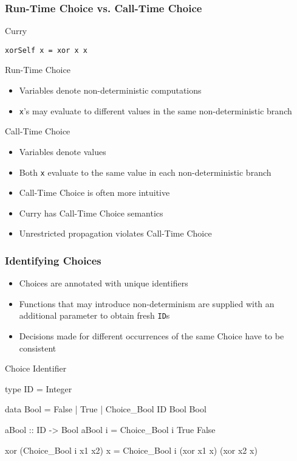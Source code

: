 \documentclass[utf8,handout]{beamer}
\begin{document}
\begin{frame}[fragile]
\frametitle{Run-Time Choice vs. Call-Time Choice}
\begin{block}{Curry}
\begin{lstlisting}
xorSelf x = xor x x
\end{lstlisting}
\end{block}
\pause
\begin{block}{Run-Time Choice}
\begin{itemize}
\item Variables denote non-deterministic computations
\item {\tt x}'s may evaluate to different values in the same non-deterministic branch
\end{itemize}
\end{block}
\pause
\begin{block}{Call-Time Choice}
\begin{itemize}
\item Variables denote values
\item Both {\tt x} evaluate to the same value in each non-deterministic branch
\end{itemize}
\end{block}
\pause
\begin{itemize}
\item Call-Time Choice is often more intuitive
\item Curry has Call-Time Choice semantics 
\item Unrestricted propagation violates Call-Time Choice
\end{itemize}
\end{frame}


\begin{frame}[fragile]
\frametitle{Identifying Choices}
\begin{itemize}
\item Choices are annotated with unique identifiers
\item Functions that may introduce non-determinism are supplied with an additional parameter to obtain fresh \verb!ID!s
\item Decisions made for different occurrences of the same Choice have to be consistent
\end{itemize}

\begin{block}{Choice Identifier}
\begin{semiverbatim}
type ID = Integer

data Bool = False | True | Choice_Bool ID Bool Bool

aBool :: ID -> Bool
aBool i = Choice_Bool i True False

xor (Choice_Bool i x1 x2) x = Choice_Bool i (xor x1 x) 
                                            (xor x2 x)
\end{semiverbatim}
\end{block}
\end{frame}
\end{document}
